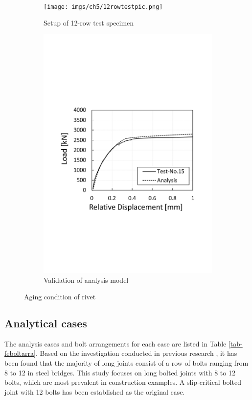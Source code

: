 \begin{figure}[htbp]
    \centering
    \begin{subfigure}[t]{0.4\textwidth}
        \centering
        \texttt{[image: imgs/ch5/12rowtestpic.png]}
        \caption{Setup of 12-row test specimen}
        \label{fig-testset}
    \end{subfigure}
    \hfill
    \begin{subfigure}[t]{0.55\textwidth}
        \centering
        \includegraphics[width=\linewidth]{imgs/ch5/validation.pdf}
        \caption{Validation of analysis model}
        \label{fig-validloadrd}
    \end{subfigure}
    \caption{Aging condition of rivet}
\end{figure}
\subsection{Analytical cases}
The analysis cases and bolt arrangements for each case are listed in Table \ref{tab-feboltarra}. Based on the investigation conducted in previous research \cite{kameilong}, it has been found that the majority of long joints consist of a row of bolts ranging from 8 to 12 in steel bridges. This study focuses on long bolted joints with 8 to 12 bolts, which are most prevalent in construction examples. A slip-critical bolted joint with 12 bolts has been established as the original case. 

